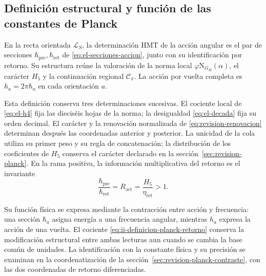 \subsection{Definición estructural y función de las constantes de Planck}
\label{sec:ii-definicion-planck}

\begin{definition}
En la recta orientada \(\mathcal L_S\), la determinación HMT de la
acción angular es el par de secciones
\(\hbar_{\mathrm{pre}},\hbar_{\mathrm{ret}}\) de
\eqref{eq:el-secciones-accion}, junto con su identificación por retorno.
Su estructura reúne la valoración de la norma local
\(\varphi\mathrm N_{G_H}(\alpha)\), el carácter \(H_5\) y la
continuación regional \(\mathcal C_\pi\). La acción por vuelta completa
es \(h_a=2\pi\hbar_a\) en cada orientación \(a\).
\end{definition}

Esta definición conserva tres determinaciones sucesivas. El cociente
local de \eqref{eq:el-h4} fija las dieciséis hojas de la norma; la
desigualdad \eqref{eq:el-decada} fija su orden decimal. El carácter y
la renovación normalizada de \eqref{eq:revision-renovacion} determinan
después las coordenadas anterior y posterior. La unicidad de la cola
utiliza su primer peso y su regla de concatenación; la distribución de
los coeficientes de \(H_5\) conserva el carácter declarado en la
sección~\ref{sec:revision-planck}. En la rama positiva, la información
multiplicativa del retorno es el invariante
\begin{equation}
 \frac{\hbar_{\mathrm{pre}}}{\hbar_{\mathrm{ret}}}
 =R_{\mathrm{act}}=\frac{H_5}{\eta_{\mathrm{ret}}}>1.
 \label{eq:ii-definicion-planck-retorno}
\end{equation}

Su función física se expresa mediante la contracción entre acción y
frecuencia: una sección \(\hbar_a\) asigna energía a una frecuencia
angular, mientras \(h_a\) expresa la acción de una vuelta. El cociente
\eqref{eq:ii-definicion-planck-retorno} conserva la modificación
estructural entre ambas lecturas aun cuando se cambia la base común
de unidades. La identificación con la constante física y su precisión
se examinan en la coordenatización de la sección~\ref{sec:revision-planck-contraste},
con las dos coordenadas de retorno diferenciadas.
